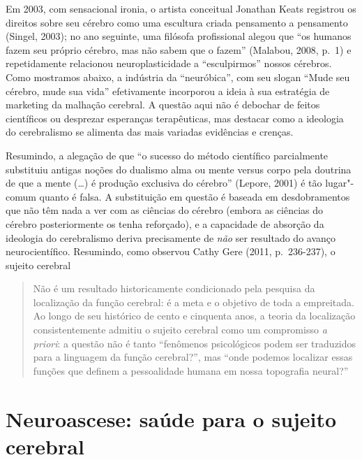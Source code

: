 Em 2003, com sensacional ironia, o artista conceitual Jonathan Keats
registrou os direitos sobre seu cérebro como uma escultura criada
pensamento a pensamento (Singel, 2003); no ano seguinte, uma filósofa
profissional alegou que ``os humanos fazem seu próprio cérebro, mas não
sabem que o fazem'' (Malabou, 2008, p.~1) e repetidamente relacionou
neuroplasticidade a ``esculpirmos'' nossos cérebros. Como mostramos
abaixo, a indústria da ``neuróbica'', com seu slogan ``Mude seu cérebro,
mude sua vida'' efetivamente incorporou a ideia à sua estratégia de
marketing da malhação cerebral. A questão aqui não é debochar de feitos
científicos ou desprezar esperanças terapêuticas, mas destacar como a
ideologia do cerebralismo se alimenta das mais variadas evidências e
crenças.

Resumindo, a alegação de que ``o sucesso do método científico
parcialmente substituiu antigas noções do dualismo alma ou mente versus
corpo pela doutrina de que a mente (\ldots{}) é produção exclusiva do
cérebro'' (Lepore, 2001) é tão lugar"-comum quanto é falsa. A
substituição em questão é baseada em desdobramentos que não têm nada a
ver com as ciências do cérebro (embora as ciências do cérebro
posteriormente os tenha reforçado), e a capacidade de absorção da
ideologia do cerebralismo deriva precisamente de \emph{não} ser
resultado do avanço neurocientífico. Resumindo, como observou Cathy Gere
(2011, p.~236-237), o sujeito cerebral

\begin{quote}
Não é um resultado historicamente condicionado pela pesquisa da
localização da função cerebral: é a meta e o objetivo de toda a
empreitada. Ao longo de seu histórico de cento e cinquenta anos, a
teoria da localização consistentemente admitiu o sujeito cerebral como
um compromisso \emph{a priori}: a questão não é tanto ``fenômenos
psicológicos podem ser traduzidos para a linguagem da função
cerebral?'', mas ``onde podemos localizar essas funções que definem a
pessoalidade humana em nossa topografia neural?''
\end{quote}

\chapter{Neuroascese: saúde para o sujeito cerebral}

